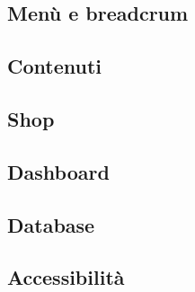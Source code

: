 \subsection{Menù e breadcrum}

\subsection{Contenuti}

\subsection{Shop}

\subsection{Dashboard}

\subsection{Database}

\subsection{Accessibilità}